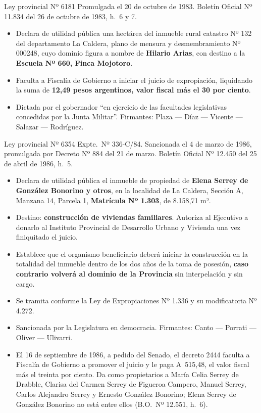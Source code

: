 \begin{ficha}{Ley provincial Nº 6181}
Promulgada el 20 de octubre de 1983. Boletín Oficial Nº 11.834 del 26 de octubre de 1983, h.\ 6 y 7.
\begin{itemize}[leftmargin=*,nosep]
\item Declara de utilidad pública una hectárea del inmueble rural catastro Nº 132 del departamento La Caldera, plano de mensura y desmembramiento Nº 000248, cuyo dominio figura a nombre de \textbf{Hilario Arias}, con destino a la \textbf{Escuela Nº 660, Finca Mojotoro}.
\item Faculta a Fiscalía de Gobierno a iniciar el juicio de expropiación, liquidando la suma de \textbf{12,49 pesos argentinos, valor fiscal más el 30 por ciento}.
\item Dictada por el gobernador ``en ejercicio de las facultades legislativas concedidas por la Junta Militar''. Firmantes: Plaza --- Díaz --- Vicente --- Salazar --- Rodríguez.
\end{itemize}
\end{ficha}

\begin{ficha}{Ley provincial Nº 6354}
Expte.\ Nº 336-C/84. Sancionada el 4 de marzo de 1986, promulgada por Decreto Nº 884 del 21 de marzo. Boletín Oficial Nº 12.450 del 25 de abril de 1986, h.\ 5.
\begin{itemize}[leftmargin=*,nosep]
\item Declara de utilidad pública el inmueble de propiedad de \textbf{Elena Serrey de González Bonorino y otros}, en la localidad de La Caldera, Sección A, Manzana 14, Parcela 1, \textbf{Matrícula Nº 1.303}, de 8.158,71 m².
\item Destino: \textbf{construcción de viviendas familiares}. Autoriza al Ejecutivo a donarlo al Instituto Provincial de Desarrollo Urbano y Vivienda una vez finiquitado el juicio.
\item Establece que el organismo beneficiario deberá iniciar la construcción en la totalidad del inmueble dentro de los dos años de la toma de posesión, \textbf{caso contrario volverá al dominio de la Provincia} sin interpelación y sin cargo.
\item Se tramita conforme la Ley de Expropiaciones Nº 1.336 y su modificatoria Nº 4.272.
\item Sancionada por la Legislatura en democracia. Firmantes: Canto --- Porrati --- Oliver --- Ulivarri.
\item El 16 de septiembre de 1986, a pedido del Senado, el decreto 2444 faculta a Fiscalía de Gobierno a promover el juicio y le paga A~515,48, el valor fiscal más el treinta por ciento. Da como propietarios a María Celia Serrey de Drabble, Clarisa del Carmen Serrey de Figueroa Campero, Manuel Serrey, Carlos Alejandro Serrey y Ernesto González Bonorino; Elena Serrey de González Bonorino no está entre ellos (B.O.\ Nº 12.551, h.\ 6).
\end{itemize}
\end{ficha}

